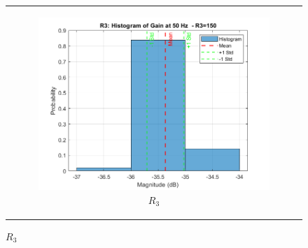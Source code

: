 \documentclass[hidelinks,12pt]{article}
\begin{document}
\begin{figure}[!h]
{\begin{tabular}{c}
\begin{subfigure}[h]{0.4\textwidth}
					\centering
					\includegraphics[width=\textwidth]{figures/r3=150/r3.png}
					\caption{$R_3$}
				\end{subfigure} \\
				

\end{tabular}}
\end{figure}
\end{document}
